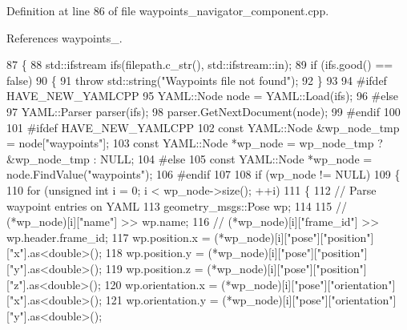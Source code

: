 Definition at line 86 of file waypoints\+\_\+navigator\+\_\+component.\+cpp.



References waypoints\+\_\+.


\begin{DoxyCode}
87 \{
88   std::ifstream ifs(filepath.c\_str(), std::ifstream::in);
89   \textcolor{keywordflow}{if} (ifs.good() == \textcolor{keyword}{false})
90   \{
91     \textcolor{keywordflow}{throw} std::string(\textcolor{stringliteral}{"Waypoints file not found"});
92   \}
93 
94 \textcolor{preprocessor}{#ifdef HAVE\_NEW\_YAMLCPP}
95   YAML::Node node = YAML::Load(ifs);
96 \textcolor{preprocessor}{#else}
97   YAML::Parser parser(ifs);
98   parser.GetNextDocument(node);
99 \textcolor{preprocessor}{#endif}
100 
101 \textcolor{preprocessor}{#ifdef HAVE\_NEW\_YAMLCPP}
102   \textcolor{keyword}{const} YAML::Node &wp\_node\_tmp = node[\textcolor{stringliteral}{"waypoints"}];
103   \textcolor{keyword}{const} YAML::Node *wp\_node = wp\_node\_tmp ? &wp\_node\_tmp : NULL;
104 \textcolor{preprocessor}{#else}
105   \textcolor{keyword}{const} YAML::Node *wp\_node = node.FindValue(\textcolor{stringliteral}{"waypoints"});
106 \textcolor{preprocessor}{#endif}
107 
108   \textcolor{keywordflow}{if} (wp\_node != NULL)
109   \{
110     \textcolor{keywordflow}{for} (\textcolor{keywordtype}{unsigned} \textcolor{keywordtype}{int} i = 0; i < wp\_node->size(); ++i)
111     \{
112       \textcolor{comment}{// Parse waypoint entries on YAML}
113       geometry\_msgs::Pose wp;
114 
115       \textcolor{comment}{// (*wp\_node)[i]["name"] >> wp.name;}
116       \textcolor{comment}{// (*wp\_node)[i]["frame\_id"] >> wp.header.frame\_id;}
117       wp.position.x = (*wp\_node)[i][\textcolor{stringliteral}{"pose"}][\textcolor{stringliteral}{"position"}][\textcolor{stringliteral}{"x"}].as<\textcolor{keywordtype}{double}>();
118       wp.position.y = (*wp\_node)[i][\textcolor{stringliteral}{"pose"}][\textcolor{stringliteral}{"position"}][\textcolor{stringliteral}{"y"}].as<\textcolor{keywordtype}{double}>();
119       wp.position.z = (*wp\_node)[i][\textcolor{stringliteral}{"pose"}][\textcolor{stringliteral}{"position"}][\textcolor{stringliteral}{"z"}].as<\textcolor{keywordtype}{double}>();
120       wp.orientation.x = (*wp\_node)[i][\textcolor{stringliteral}{"pose"}][\textcolor{stringliteral}{"orientation"}][\textcolor{stringliteral}{"x"}].as<\textcolor{keywordtype}{double}>();
121       wp.orientation.y = (*wp\_node)[i][\textcolor{stringliteral}{"pose"}][\textcolor{stringliteral}{"orientation"}][\textcolor{stringliteral}{"y"}].as<\textcolor{keywordtype}{double}>();

\end{DoxyCode}
